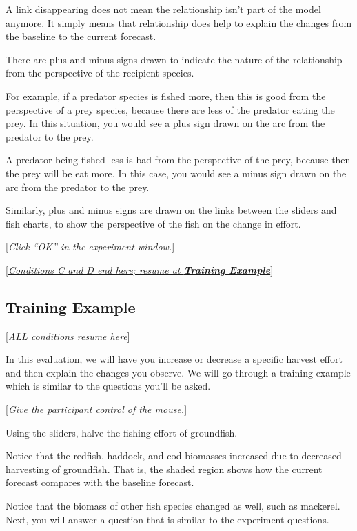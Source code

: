 {{{{\begin{minipage}{\textwidth}
{A link disappearing does not mean the relationship isn't part of the model anymore.  It simply means that relationship does help to explain the changes from the baseline to the current forecast.

There are plus and minus signs drawn to indicate the nature of the relationship from the perspective of the recipient species.

For example, if a predator species is fished more, then this is good from the perspective of a prey species, because there are less of the predator eating the prey.  In this situation, you would see a plus sign drawn on the arc from the predator to the prey.

A predator being fished less is bad from the perspective of the prey, because then the prey will be eat more.  In this case, you would see a minus sign drawn on the arc from the predator to the prey.

Similarly, plus and minus signs are drawn on the links between the sliders and fish charts, to show the perspective of the fish on the change in effort.


[\textit{Click ``OK'' in the experiment window.}]

[\underline{\textit{Conditions C and D end here; resume at \textbf{Training Example}}}]
}
\end{minipage}
}

\subsection{Training Example}

[\underline{\textit{ALL conditions resume here}}]

In this evaluation, we will have you increase or decrease a specific harvest effort and then explain the changes you observe.  We will go through a training example which is similar to the questions you'll be asked.

[\textit{Give the participant control of the mouse.}]

Using the sliders, halve the fishing effort of groundfish.

Notice that the redfish, haddock, and cod biomasses increased due to decreased harvesting of groundfish.  That is, the shaded region shows how the current forecast compares with the baseline forecast.

Notice that the biomass of other fish species changed as well, such as mackerel. Next, you will answer a question that is similar to the experiment questions.

}}}
